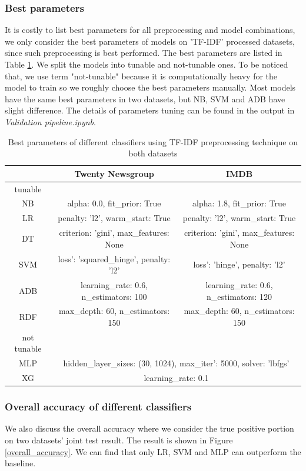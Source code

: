 \documentclass[11pt]{scrartcl}
\begin{document}
\subsubsection*{Best parameters}
It is costly to list best parameters for all preprocessing and model combinations, we only consider the best parameters of models on 'TF-IDF' processed datasets, since such preprocessing is best performed. The best parameters are listed in Table \ref{params}. We split the models into tunable and not-tunable ones. To be noticed that, we use term "not-tunable" because it is computationally heavy for the model to train so we roughly choose the best parameters manually. Most models have the same best parameters in two datasets, but NB, SVM and ADB have slight difference. The details of parameters tuning can be found in the output in \textit{Validation pipeline.ipynb}.

\begin{table}[H]
    \centering
    \begin{tabular}{c|cc}
        \hline
         &  Twenty Newsgroup  &  IMDB  \\
		\hline
		tunable & & \\
		\hline
        NB & alpha: 0.0, fit\_prior: True & alpha: 1.8, fit\_prior: True \\
		LR & penalty: 'l2', warm\_start: True & penalty: 'l2', warm\_start: True \\
		DT & criterion: 'gini', max\_features: None & criterion: 'gini', max\_features: None \\
		SVM & loss': 'squared\_hinge', penalty: 'l2' & loss': 'hinge', penalty: 'l2'\\
		ADB & learning\_rate: 0.6, n\_estimators: 100 & learning\_rate: 0.6, n\_estimators: 120 \\
		RDF & max\_depth: 60, n\_estimators: 150 & max\_depth: 60, n\_estimators: 150 \\
		\hline
		not tunable & & \\
		\hline
		MLP &  \multicolumn{2}{c}{hidden\_layer\_sizes: (30, 1024), max\_iter': 5000, solver: 'lbfgs' }  \\
		XG & \multicolumn{2}{c}{learning\_rate: 0.1}  \\
        \hline
    \end{tabular} 
    \caption{Best parameters of different classifiers using TF-IDF preprocessing technique on both datasets}
    \label{params}
\end{table}

\subsubsection*{Overall accuracy of different classifiers}
We also discuss the overall accuracy where we consider the true positive portion on two datasets' joint test result. The result is shown in Figure \ref{overall_accuracy}. We can find that only LR, SVM and MLP can outperform the baseline.
\end{document}
